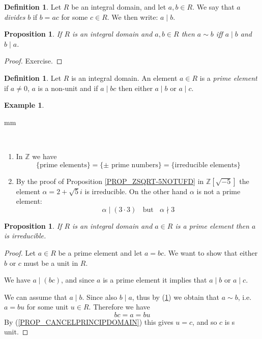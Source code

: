 \documentclass[12pt, letterpaper, oneside]{article}
\theoremstyle{plain}
\newtheorem{proposition}[theorem]{Proposition}
\theoremstyle{definition}
\newtheorem{definition}[theorem]{Definition}
\newtheorem{example}[theorem]{Example}
\newcommand{\Z}{{\mathbb Z}}
\newcommand{\benu}{\begin{enumerate}}
\newcommand{\eenu}{\end{enumerate}}
\newcommand{\vs}{\vskip 5mm}
\newcommand{\isep}[1][0]{\setlength{\itemsep}{#1 mm}}
\begin{document}
\begin{definition}
Let $R$ be an integral domain, and let $a, b\in R$. We say that $a$ \emph{divides} $b$
if $b = ac$ for some $c\in R$. We then write: $a\mid b$.
\end{definition}


\vs\vs

\begin{proposition}
\label{PROP_SIMDIVEQUIV}
If $R$ is an integral domain and $a, b\in R$ then $a\sim b$ iff $a\mid b$ and $b\mid a$.
\end{proposition}

\vs

\begin{proof}
Exercise.
\end{proof}


\vs\vs

\begin{definition}
Let $R$ is an integral domain. An element $a\in R$ is a \emph{prime element} if  $a\neq 0$, 
$a$ is a non-unit and if $a\mid bc$ then either $a\mid b$ or $a\mid c$.
\end{definition}


\vs\vs


\begin{example}\ 

 mm

\ 
\benu
\isep[5]
\item In $\Z$ we have 
$$\{\text{prime elements}\} = \{\pm \text{ prime numbers}\} = \{\text{irreducible elements}\}$$

\item By the proof of Proposition \ref{PROP_ZSQRT-5NOTUFD}  in $\Z[\sqrt{-5}]$ the element 
$\alpha = 2+\sqrt{5}i$ is irreducible. On the other hand $\alpha$ is not a prime element:
$$\alpha\mid (3\cdot 3) \ \ \ \ \text{but} \ \ \ \   \alpha \nmid 3$$

\eenu

\end{example}

\vs\vs


\begin{proposition}
\label{PROP_PRIMEISIRRED}
If $R$ is an integral domain and $a\in R$ is a prime element then $a$ is irreducible. 
\end{proposition}

\vs

\begin{proof}
Let $a\in R$ be a prime element and let $a= bc$. We want to show that either $b$ or $c$
must be a unit in $R$.

We have $a\mid (bc)$, and since $a$ is a prime element it implies
that $a\mid b$ or $a\mid c$. 

We can assume  that $a\mid b$.  Since also $b\mid a$, thus by (\ref{PROP_SIMDIVEQUIV}) we obtain that 
$a\sim b$, i.e. $a = bu$ for some unit $u\in R$. Therefore we have
$$bc = a = bu$$ 
By (\ref{PROP_CANCELPRINCIPDOMAIN})  this gives $u=c$, and so $c$ is s unit.
\end{proof}
\end{document}
